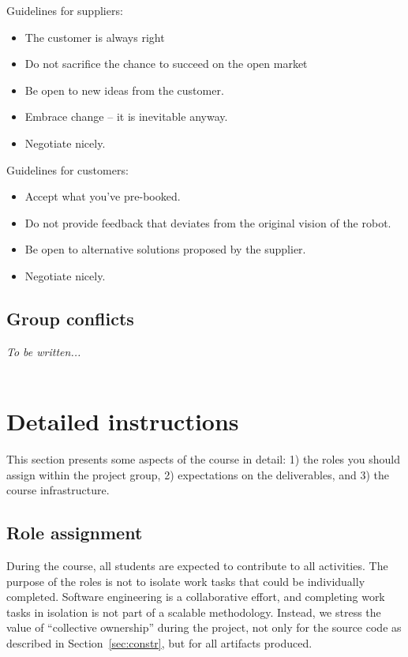 \documentclass{scrreprt}
\begin{document}
Guidelines for suppliers:
\begin{itemize}
\item The customer is always right
\item Do not sacrifice the chance to succeed on the open market
\item Be open to new ideas from the customer.
\item Embrace change -- it is inevitable anyway.
\item Negotiate nicely.
\end{itemize}

Guidelines for customers:
\begin{itemize}
\item Accept what you've pre-booked.
\item Do not provide feedback that deviates from the original vision of the robot.
\item Be open to alternative solutions proposed by the supplier.
\item Negotiate nicely.
\end{itemize}

\section{Group conflicts}
\emph{To be written...}\\\\

\chapter{Detailed instructions}
This section presents some aspects of the course in detail: 1) the roles you should assign within the project group, 2) expectations on the deliverables, and 3) the course infrastructure.

\section{Role assignment} \label{sec:roles}
During the course, all students are expected to contribute to all activities. The purpose of the roles is not to isolate work tasks that could be individually completed. Software engineering is a collaborative effort, and completing work tasks in isolation is not part of a scalable methodology. Instead, we stress the value of ``collective ownership'' during the project, not only for the source code as described in Section~\ref{sec:constr}, but for all artifacts produced.
\end{document}
